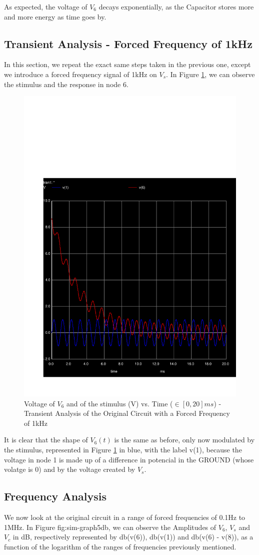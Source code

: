 As expected, the voltage of $V_6$ decays exponentially, as the Capacitor stores more and more energy as time goes by.


\newpage

\subsection{Transient Analysis - Forced Frequency of 1kHz}

In this section, we repeat the exact same steps taken in the previous one, except we introduce a forced frequency signal of 1kHz on $V_s$. In Figure \ref{fig:sim-graph4}, we can observe the stimulus and the response in node 6.


\begin{figure}[h] \centering
\includegraphics[width=0.4\linewidth]{../sim/trans4.pdf}
\caption{Voltage of $V_6$ and of the stimulus (V) vs. Time ($\in [0, 20]ms$) - Transient Analysis of the Original Circuit with a Forced Frequency of 1kHz}
\label{fig:sim-graph4}
\end{figure}

It is clear that the shape of $V_6(t)$ is the same as before, only now modulated by the stimulus, represented in Figure \ref{fig:sim-graph4} in blue, with the label v(1), because the voltage in node 1 is made up of a difference in potencial in the GROUND (whose volatge is 0) and by the voltage created by $V_s$.



\subsection{Frequency Analysis}

We now look at the original circuit in a range of forced frequencies of 0.1Hz to 1MHz. In Figure {fig:sim-graph5db}, we can observe the Amplitudes of $V_6$, $V_s$ and $V_c$ in dB, respectively represented by db(v(6)), db(v(1)) and db(v(6) - v(8)), as a function of the logarithm of the ranges of frequencies previously mentioned.



